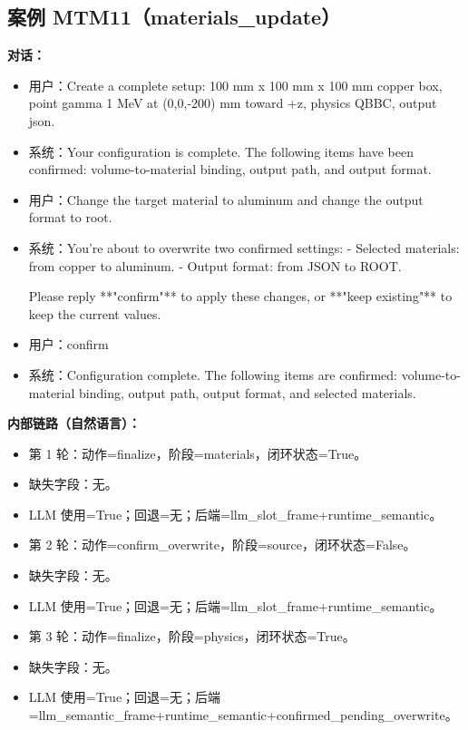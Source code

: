 \documentclass[11pt]{ctexart}
\begin{document}
\subsection{案例 MTM11（materials\_update）}
\textbf{对话：}
\begin{itemize}
\item 用户：Create a complete setup: 100 mm x 100 mm x 100 mm copper box, point gamma 1 MeV at (0,0,-200) mm toward +z, physics QBBC, output json.
\item 系统：Your configuration is complete. The following items have been confirmed: volume-to-material binding, output path, and output format.
\item 用户：Change the target material to aluminum and change the output format to root.
\item 系统：You're about to overwrite two confirmed settings:
- Selected materials: from copper to aluminum.
- Output format: from JSON to ROOT.

Please reply **"confirm"** to apply these changes, or **"keep existing"** to keep the current values.
\item 用户：confirm
\item 系统：Configuration complete. The following items are confirmed: volume-to-material binding, output path, output format, and selected materials.
\end{itemize}
\textbf{内部链路（自然语言）：}
\begin{itemize}
\item 第 1 轮：动作=finalize，阶段=materials，闭环状态=True。
\item 缺失字段：无。
\item LLM 使用=True；回退=无；后端=llm\_slot\_frame+runtime\_semantic。
\item 第 2 轮：动作=confirm\_overwrite，阶段=source，闭环状态=False。
\item 缺失字段：无。
\item LLM 使用=True；回退=无；后端=llm\_slot\_frame+runtime\_semantic。
\item 第 3 轮：动作=finalize，阶段=physics，闭环状态=True。
\item 缺失字段：无。
\item LLM 使用=True；回退=无；后端=llm\_semantic\_frame+runtime\_semantic+confirmed\_pending\_overwrite。
\end{itemize}
\end{document}

